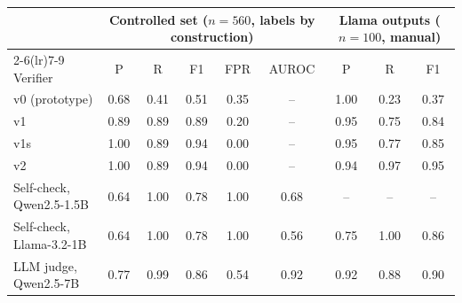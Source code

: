 \begin{tabular}{lcccccccc}
\toprule
 & \multicolumn{5}{c}{Controlled set ($n{=}560$, labels by construction)} & \multicolumn{3}{c}{Llama outputs ($n{=}100$, manual)} \\
\cmidrule(lr){2-6}\cmidrule(lr){7-9}
Verifier & P & R & F1 & FPR & AUROC & P & R & F1 \\
\midrule
v0 (prototype) & 0.68 & 0.41 & 0.51 & 0.35 & -- & 1.00 & 0.23 & 0.37 \\
v1 & 0.89 & 0.89 & 0.89 & 0.20 & -- & 0.95 & 0.75 & 0.84 \\
v1s & 1.00 & 0.89 & 0.94 & 0.00 & -- & 0.95 & 0.77 & 0.85 \\
v2 & 1.00 & 0.89 & 0.94 & 0.00 & -- & 0.94 & 0.97 & 0.95 \\
\midrule
Self-check, Qwen2.5-1.5B & 0.64 & 1.00 & 0.78 & 1.00 & 0.68 & -- & -- & -- \\
Self-check, Llama-3.2-1B & 0.64 & 1.00 & 0.78 & 1.00 & 0.56 & 0.75 & 1.00 & 0.86 \\
LLM judge, Qwen2.5-7B & 0.77 & 0.99 & 0.86 & 0.54 & 0.92 & 0.92 & 0.88 & 0.90 \\
\bottomrule
\end{tabular}